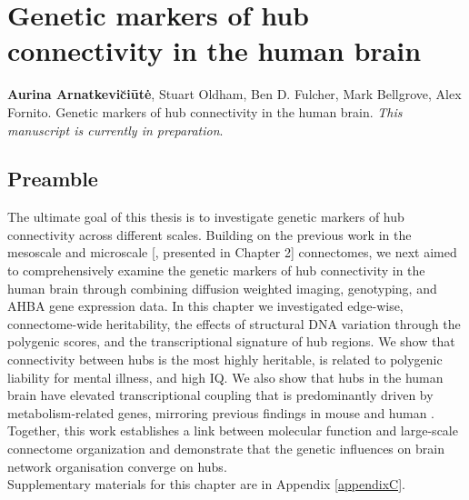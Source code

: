 \chapter{Genetic markers of hub connectivity in the human brain}
\label{ch:Chapter5}

\textbf{Aurina Arnatkevi\u{c}i\={u}t\.{e}},
Stuart Oldham,
Ben D. Fulcher,
Mark Bellgrove,
Alex Fornito.
Genetic markers of hub connectivity in the human brain. \textit{This manuscript is currently in preparation}.\\

\section*{Preamble}
The ultimate goal of this thesis is to investigate genetic markers of hub connectivity across different scales. Building on the previous work in the mesoscale \citep{Fulcher2016} and microscale [\citep{Arnatkeviciute2018}, presented in Chapter 2] connectomes, we next aimed to comprehensively examine the genetic markers of hub connectivity in the human brain through combining diffusion weighted imaging, genotyping, and AHBA gene expression data. In this chapter we investigated edge-wise, connectome-wide heritability, the effects of structural DNA variation through the polygenic scores, and the transcriptional signature of hub regions. We show that connectivity between hubs is the most highly heritable, is related to polygenic liability for mental illness, and high IQ. We also show that hubs in the human brain have elevated transcriptional coupling that is predominantly driven by metabolism-related genes, mirroring previous findings in mouse \citep{Fulcher2016} and human \citep{Vertes2016b}. Together, this work establishes a link between molecular function and large-scale connectome organization and demonstrate that the genetic influences on brain network organisation converge on hubs.\\
Supplementary materials for this chapter are in Appendix \ref{appendixC}.

\newpage

